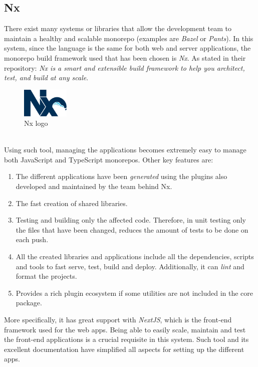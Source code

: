 \documentclass[a4paper, 12pt, oneside]{book}
\begin{document}
\subsection{Nx}
There exist many systems or libraries that allow the development team to maintain a healthy and scalable monorepo (examples are \emph{Bazel} or \emph{Pants}). In this system, since the language is the same for both web and server applications, the monorepo build framework used that has been chosen is \emph{Nx}. As stated in their repository: \emph{Nx is a smart and extensible build framework to help you architect, test, and build at any scale}.
\\
\begin{figure}[h!]
	\centering
	\includegraphics[width=0.2\textwidth]{assets/nx-logo.png}
	\caption{Nx logo}
\end{figure}
\\
Using such tool, managing the applications becomes extremely easy to manage both JavaScript and TypeScript monorepos. Other key features are:
\begin{enumerate}[label = -]
	\item The different applications have been \emph{generated} using the plugins also developed and maintained by the team behind Nx.
	\item The fast creation of shared libraries.
	\item Testing and building only the affected code. Therefore, in unit testing only the files that have been changed, reduces the amount of tests to be done on each push.
	\item All the created libraries and applications include all the dependencies, scripts and tools to fast serve, test, build and deploy. Additionally, it can \emph{lint} and format the projects.
	\item Provides a rich plugin ecosystem if some utilities are not included in the core package.
\end{enumerate}
More specifically, it has great support with \emph{NextJS}, which is the front-end framework used for the web apps. Being able to easily scale, maintain and test the front-end applications is a crucial requisite in this system. Such tool and its excellent documentation have simplified all aspects for setting up the different apps.
\\[8pt]
\end{document}
